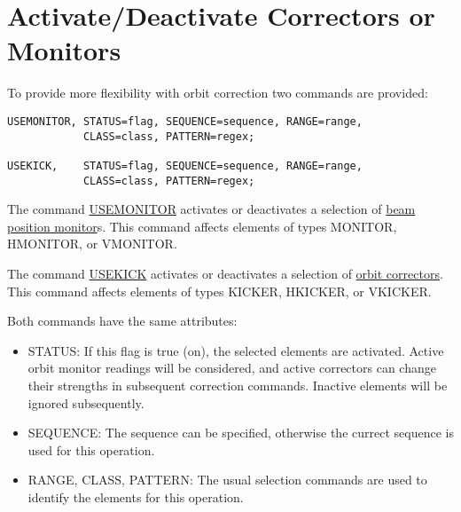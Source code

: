 
\section{Activate/Deactivate Correctors or Monitors}
\label{sec:activate}
To provide more flexibility with orbit correction two commands are
provided:  

\begin{verbatim}
USEMONITOR, STATUS=flag, SEQUENCE=sequence, RANGE=range, 
            CLASS=class, PATTERN=regex;

USEKICK,    STATUS=flag, SEQUENCE=sequence, RANGE=range,
            CLASS=class, PATTERN=regex;
\end{verbatim}

The command \href{monitor}{USEMONITOR} activates or deactivates a
selection of \href{../Introduction/monitors.html}{beam position
 monitor}s. This command affects elements of types MONITOR, HMONITOR,
or VMONITOR.    

The command  \href{kick}{USEKICK} activates or deactivates a selection
of \href{../Introduction/kickers.html}{orbit correctors}. This command
affects elements of types KICKER, HKICKER, or VKICKER.   



Both commands have the same attributes: 
\begin{itemize}
   \item STATUS: If this flag is true (on), the selected elements
     are activated. Active orbit monitor readings will be
     considered, and active correctors can change their strengths
     in subsequent correction commands. Inactive elements will be
     ignored subsequently.  
   \item SEQUENCE: The sequence can be specified, otherwise the
     currect sequence is used for this operation.  
   \item RANGE, CLASS, PATTERN: The usual selection commands are
     used to identify the elements for this operation.  
\end{itemize} 

